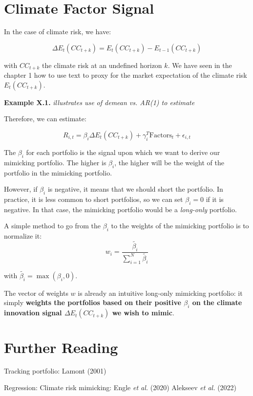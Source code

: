 \section{Climate Factor Signal}

In the case of climate risk, we have:

\begin{equation}
    \Delta E_t (CC_{t+k}) = E_t (CC_{t+k}) - E_{t-1} (CC_{t+k})
\end{equation}

with $CC_{t+k}$ the climate risk at an undefined horizon $k$.
We have seen in the chapter 1 how to use text to proxy for 
the market expectation of the climate risk $E_t(CC_{t+k})$.


\begin{examplebox}
    \textbf{Example X.1.}    
    \textit{illustrates use of demean vs. AR(1) to estimate}
\end{examplebox}


Therefore, we can estimate:

\begin{equation}
    R_{i,t} = \beta_i \Delta E_t(CC_{t+k}) + \gamma_i^T \text{Factors}_t + \epsilon_{i,t}
\end{equation}

The $\beta_i$ for each portfolio is the signal 
upon which we want to derive our mimicking portfolio.
The higher is $\beta_i$, the higher will be the weight 
of the portfolio in the mimicking portfolio.

However, if $\beta_i$ is negative, it means that
we should short the portfolio. In practice, 
it is less common to short portfolios, so we
can set $\beta_i = 0$ if it is negative. In that 
case, the mimicking portfolio would be a \textit{long-only}
portfolio.

A simple method to go from the $\beta_i$ to the
weights of the mimicking portfolio is to normalize it:
\begin{equation}
    w_i = \frac{\tilde{\beta_i}}{\sum_{i=1}^{N} \tilde{\beta_i}}
\end{equation}

with $\tilde{\beta_i} = \max(\beta_i, 0)$.

The vector of weights $w$ is already an intuitive 
long-only mimicking portfolio: it simply 
\textbf{weights the portfolios based on their positive 
$\beta_i$ on the climate innovation signal 
$\Delta E_t(CC_{t+k})$ we wish to mimic}.
 

\section{Further Reading}

Tracking portfolio: Lamont (2001) \cite{lamont2001economic}

Regression: 
Climate risk mimicking: Engle \textit{et al.} (2020) \cite{engle2020hedging}
Alekseev \textit{et al.} (2022) \cite{alekseev2022quantity}
